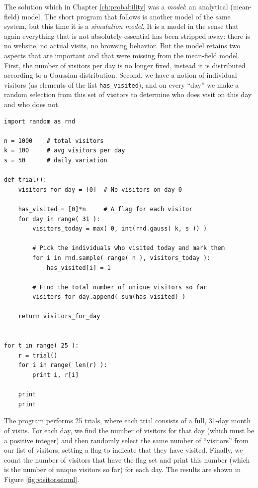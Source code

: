 The solution which in Chapter \ref{ch:probability} was a \emph{model}:
an analytical (mean-field) model.  The short program that follows is
another model of the same system, but this time it is a
\emph{simulation model}. It is a model in the sense that again
everything that is not absolutely essential has been stripped away:
there is no website, no actual visits, no browsing behavior. But the
model retains two aspects that are important and that were missing
from the mean-field model. First, the number of visitors per day is no
longer fixed, instead it is distributed according to a Gaussian
distribution.  Second, we have a notion of individual visitors (as
elements of the list \texttt{has\_visited}), and on every ``day'' we
make a random selection from this set of visitors to determine who
does visit on this day and who does not.

\begin{verbatim}
import random as rnd

n = 1000    # total visitors
k = 100     # avg visitors per day
s = 50      # daily variation

def trial():
    visitors_for_day = [0]  # No visitors on day 0

    has_visited = [0]*n     # A flag for each visitor
    for day in range( 31 ):
        visitors_today = max( 0, int(rnd.gauss( k, s )) )

        # Pick the individuals who visited today and mark them 
        for i in rnd.sample( range( n ), visitors_today ):
            has_visited[i] = 1  

        # Find the total number of unique visitors so far
        visitors_for_day.append( sum(has_visited) )

    return visitors_for_day
    
    
for t in range( 25 ):
    r = trial()
    for i in range( len(r) ):
        print i, r[i]

    print
    print
\end{verbatim}

The program performs 25 trials, where each trial consists of a full,
31-day month of visits. For each day, we find the number of visitors
for that day (which must be a positive integer) and then randomly
select the same number of ``visitors'' from our list of visitors,
setting a flag to indicate that they have visited. Finally, we count
the number of visitors that have the flag set and print this number
(which is the number of unique visitors so far) for each day. The
results are shown in Figure \ref{fig:visitorssimul}.


